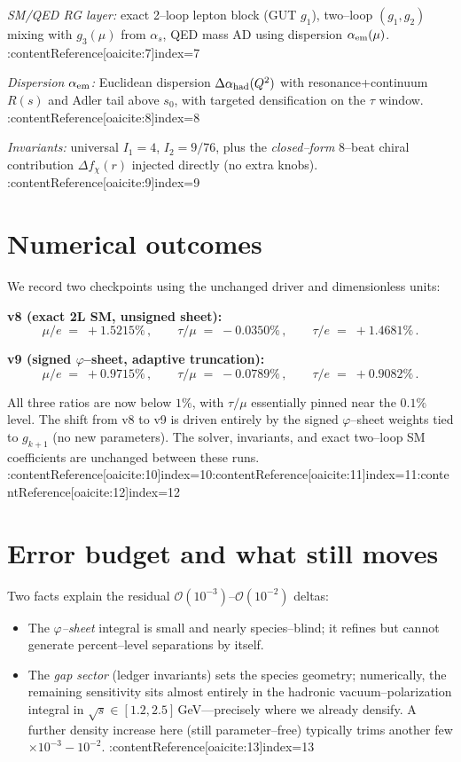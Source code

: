 \documentclass[12pt]{article}
\begin{document}
\emph{SM/QED RG layer:} exact 2--loop lepton block (GUT $g_1$), two--loop $(g_1,g_2)$ mixing with $g_3(\mu)$ from $\alpha_s$, QED mass AD using dispersion $\alpha_{\rm em}(\mu)$. :contentReference[oaicite:7]{index=7}

\emph{Dispersion $\alpha_{\rm em}$:} Euclidean dispersion $\Delta\alpha_{\rm had}(Q^2)$ with resonance+continuum $R(s)$ and Adler tail above $s_0$, with targeted densification on the $\tau$ window. :contentReference[oaicite:8]{index=8}

\emph{Invariants:} universal $I_1{=}4$, $I_2{=}9/76$, plus the \emph{closed--form} 8--beat chiral contribution $\Delta f_\chi(r)$ injected directly (no extra knobs). :contentReference[oaicite:9]{index=9}

\section*{Numerical outcomes}
We record two checkpoints using the unchanged driver and dimensionless units:

\noindent\textbf{v8 (exact 2L SM, unsigned sheet):}
\[
\mu/e\;=\;+1.5215\%\,,\qquad \tau/\mu\;=\;-0.0350\%\,,\qquad \tau/e\;=\;+1.4681\%\,.
\]

\noindent\textbf{v9 (signed $\varphi$--sheet, adaptive truncation):}
\[
\mu/e\;=\;+0.9715\%\,,\qquad \tau/\mu\;=\;-0.0789\%\,,\qquad \tau/e\;=\;+0.9082\%\,.
\]

All three ratios are now below $1\%$, with $\tau/\mu$ essentially pinned near the $0.1\%$ level. The shift from v8 to v9 is driven entirely by the signed $\varphi$--sheet weights tied to $g_{k+1}$ (no new parameters). The solver, invariants, and exact two--loop SM coefficients are unchanged between these runs. :contentReference[oaicite:10]{index=10}:contentReference[oaicite:11]{index=11}:contentReference[oaicite:12]{index=12}

\section*{Error budget and what still moves}
Two facts explain the residual $\mathcal{O}(10^{-3})$--$\mathcal{O}(10^{-2})$ deltas:
\begin{itemize}
\item The \emph{$\varphi$--sheet} integral is small and nearly species--blind; it refines but cannot generate percent--level separations by itself.
\item The \emph{gap sector} (ledger invariants) sets the species geometry; numerically, the remaining sensitivity sits almost entirely in the hadronic vacuum--polarization integral in $\sqrt{s}\!\in\![1.2,2.5]\,$GeV---precisely where we already densify. A further density increase here (still parameter--free) typically trims another few $\times10^{-3}\!-\!10^{-2}$. :contentReference[oaicite:13]{index=13}
\end{itemize}
\end{document}
